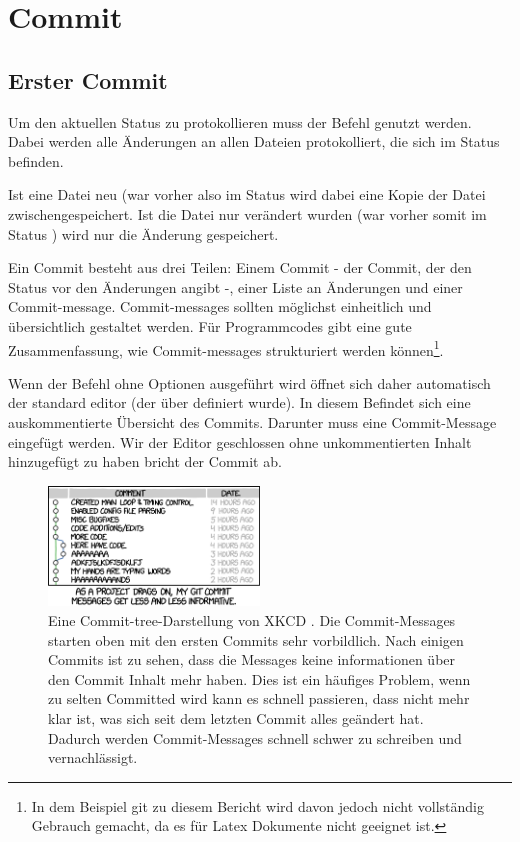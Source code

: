 \section{Commit}
\subsection{Erster Commit}
Um den aktuellen Status zu protokollieren muss der Befehl  genutzt werden. Dabei werden alle Änderungen an allen Dateien protokolliert, die sich im Status  befinden.

Ist eine Datei neu (war vorher also im Status  wird dabei eine Kopie der Datei zwischengespeichert. Ist die Datei nur verändert wurden (war vorher somit im Status ) wird nur die Änderung gespeichert.

Ein Commit besteht aus drei Teilen: Einem  Commit - der Commit, der den Status vor den Änderungen angibt -, einer Liste an Änderungen und einer Commit-message. Commit-messages sollten möglichst einheitlich und übersichtlich gestaltet werden. Für Programmcodes gibt \cite{conv-Commit} eine gute Zusammenfassung, wie Commit-messages strukturiert werden können\footnote{In dem Beispiel git zu diesem Bericht wird davon jedoch nicht vollständig Gebrauch gemacht, da es für Latex Dokumente nicht geeignet ist.}.

Wenn der Befehl  ohne Optionen ausgeführt wird öffnet sich daher automatisch der standard editor (der über  definiert wurde). In diesem Befindet sich eine auskommentierte Übersicht des Commits. Darunter muss eine Commit-Message eingefügt werden. Wir der Editor geschlossen ohne unkommentierten Inhalt hinzugefügt zu haben bricht der Commit ab.
\begin{figure}[!h]
        \centering
        \includegraphics[width=0.5\textwidth]{Bilder/git_commit.png}
        \caption{Eine Commit-tree-Darstellung von XKCD \cite{Munroe}. Die Commit-Messages starten oben mit den ersten Commits sehr vorbildlich. Nach einigen Commits ist zu sehen, dass die Messages keine informationen über den Commit Inhalt mehr haben. Dies ist ein häufiges Problem, wenn zu selten Committed wird kann es schnell passieren, dass nicht mehr klar ist, was sich seit dem letzten Commit alles geändert hat. Dadurch werden Commit-Messages schnell schwer zu schreiben und vernachlässigt.}
        \label{fig:Commit-XKCD}
\end{figure}

